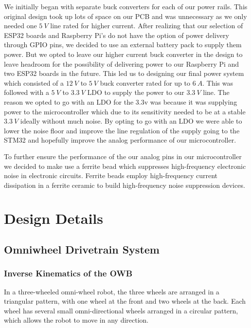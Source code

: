 \documentclass{report}
\begin{document}
    We initially began with separate buck converters for each of our power rails. This original design took up lots of space on our PCB and was unnecessary as we only needed one $5~V$ line rated for higher current. After realizing that our selection of ESP32 boards and Raspberry Pi's do not have the option of power delivery through GPIO pins, we decided to use an external battery pack to supply them power. But we opted to leave our higher current buck converter in the design to leave headroom for the possibility of delivering power to our Raspberry Pi and two ESP32 boards in the future. This led us to designing our final power system which consisted of a $12~V$ to $5~V$ buck converter rated for up to $6~A$. This was followed with a $5~V$ to $3.3~V$ LDO to supply the power to our $3.3~V$ line. The reason we opted to go with an LDO for the 3.3v was because it was supplying power to the microcontroller which due to its sensitivity needed to be at a stable $3.3~V$ ideally without much noise. By opting to go with an LDO we were able to lower the noise floor and improve the line regulation of the supply going to the STM32 and hopefully improve the analog performance of our microcontroller.

    To further ensure the performance of the our analog pins in our microcontroller we decided to make use a ferrite bead which suppresses high-frequency electronic noise in electronic circuits. Ferrite beads employ high-frequency current dissipation in a ferrite ceramic to build high-frequency noise suppression devices.

    \section{Design Details}

    \subsection{Omniwheel Drivetrain System}
    \subsubsection{Inverse Kinematics of the OWB}
    \label{sec:Omniwheel-InverseKinematics}
    In a three-wheeled omni-wheel robot, the three wheels are arranged in a triangular pattern, with one wheel at the front and two wheels at the back. Each wheel has several small omni-directional wheels arranged in a circular pattern, which allows the robot to move in any direction.
    
\end{document}
